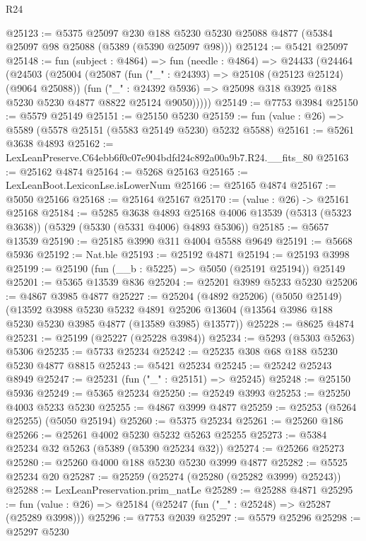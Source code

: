 \begin{lexlean}{R24}
\begin{coremodule}
@25123 := @5375
    @25097
    @230
    @188
    @5230
    @5230
    @25088
    @4877
    (@5384 @25097 @98 @25088 (@5389 (@5390 @25097 @98)))
@25124 := @5421 @25097
@25148 := fun (subject : @4864) =>
  fun (needle : @4864) =>
  @24433
    (@24464
      (@24503
        (@25004
          (@25087
            (fun ("_" : @24393) => @25108 (@25123 @25124) (@9064 @25088))
            (fun ("_" : @24392 @5936) =>
            @25098 @318 @3925 @188 @5230 @5230 @4877 @8822 @25124 @9050)))))
@25149 := @7753 @3984
@25150 := @5579 @25149
@25151 := @25150 @5230
@25159 := fun (value : @26) => @5589 (@5578 @25151 (@5583 @25149 @5230) @5232 @5588)
@25161 := @5261 @3638 @4893
@25162 := LexLeanPreserve.C64ebb6f0c07e904bdfd24c892a00a9b7.R24.__fits_80
@25163 := @25162 @4874
@25164 := @5268 @25163
@25165 := LexLeanBoot.LexiconLse.isLowerNum
@25166 := @25165 @4874
@25167 := @5050 @25166
@25168 := @25164 @25167
@25170 := (value : @26) -> @25161 @25168
@25184 := @5285
    @3638
    @4893
    @25168
    @4006
    @13539
    (@5313 (@5323 @3638))
    (@5329 (@5330 (@5331 @4006) @4893 @5306))
@25185 := @5657 @13539
@25190 := @25185 @3990 @311 @4004 @5588 @9649
@25191 := @5668 @5936
@25192 := Nat.ble
@25193 := @25192 @4871
@25194 := @25193 @3998
@25199 := @25190 (fun (__b : @5225) => @5050 (@25191 @25194)) @25149
@25201 := @5365 @13539 @836
@25204 := @25201 @3989 @5233 @5230
@25206 := @4867 @3985 @4877
@25227 := @25204
    (@4892 @25206)
    (@5050 @25149)
    (@13592
      @3988
      @5230
      @5232
      @4891
      @25206
      @13604
      (@13564 @3986 @188 @5230 @5230 @3985 @4877 (@13589 @3985) @13577))
@25228 := @8625 @4874
@25231 := @25199 (@25227 (@25228 @3984))
@25234 := @5293 (@5303 @5263) @5306
@25235 := @5733 @25234
@25242 := @25235 @308 @68 @188 @5230 @5230 @4877 @8815
@25243 := @5421 @25234
@25245 := @25242 @25243 @8949
@25247 := @25231 (fun ("_" : @25151) => @25245)
@25248 := @25150 @5936
@25249 := @5365 @25234
@25250 := @25249 @3993
@25253 := @25250 @4003 @5233 @5230
@25255 := @4867 @3999 @4877
@25259 := @25253 (@5264 @25255) (@5050 @25194)
@25260 := @5375 @25234
@25261 := @25260 @186
@25266 := @25261 @4002 @5230 @5232 @5263 @25255
@25273 := @5384 @25234 @32 @5263 (@5389 (@5390 @25234 @32))
@25274 := @25266 @25273
@25280 := @25260 @4000 @188 @5230 @5230 @3999 @4877
@25282 := @5525 @25234 @20
@25287 := @25259 (@25274 (@25280 (@25282 @3999) @25243))
@25288 := LexLeanPreservation.prim_natLe
@25289 := @25288 @4871
@25295 := fun (value : @26) => @25184 (@25247 (fun ("_" : @25248) => @25287 (@25289 @3998)))
@25296 := @7753 @2039
@25297 := @5579 @25296
@25298 := @25297 @5230

\end{coremodule}
\end{lexlean}
